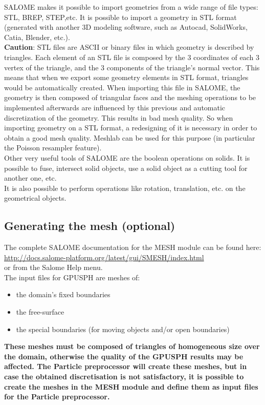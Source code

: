 \documentclass{../GPUSPHtemplate}
\begin{document}
SALOME makes it possible to import geometries from 
a wide range of file types: STL, BREP, STEP,etc. 
It is possible to import a geometry in STL format 
(generated with another 3D modeling software, such 
as Autocad, SolidWorks, Catia, Blender, etc.). \\

\textbf{Caution}: STL files are ASCII or binary 
files in which geometry is described by triangles. 
Each element of an STL file is composed by the 3 
coordinates of each 3 vertex of the triangle, 
and the 3 components of the triangle’s normal vector. 
This means that when we export some geometry 
elements in STL format, triangles would be automatically created. 
When importing this file in SALOME, the geometry is then 
composed of triangular faces and the meshing operations 
to be implemented afterwards are influenced by this previous 
and automatic discretization of the geometry.
This results in bad mesh quality.
So when importing geometry on a STL format, a redesigning of it is necessary 
in order to obtain a good mesh quality. Meshlab can be used for this purpose (in particular
the Poisson resampler feature).\\

Other very useful tools of SALOME are the boolean operations on solids.
It is possible to fuse, intersect solid objects, use a solid object as a 
cutting tool for another one, etc.\\

It is also possible to perform operations like rotation, translation, etc. on
the geometrical objects.\\

\subsection{Generating the mesh (optional)}

The complete SALOME documentation for the MESH module can be found here:\\
\url{http://docs.salome-platform.org/latest/gui/SMESH/index.html}\\
or from the Salome Help menu.\\

The input files for GPUSPH are meshes of:
\begin{itemize}
\item the domain's fixed boundaries
\item the free-surface
\item the special boundaries (for moving objects 
and/or open boundaries)
\end{itemize}
\textbf{These meshes must be composed of triangles of homogeneous size over the domain,
  otherwise the quality of the GPUSPH results may be affected.
  The Particle preprocessor will create these meshes, but
  in case the obtained discretisation is not satisfactory,
  it is possible to create the meshes in the MESH module
  and define them as input files for the Particle preprocessor.}
\end{document}
